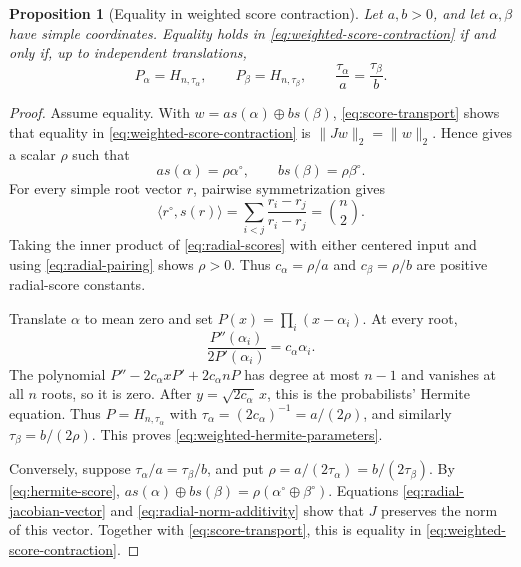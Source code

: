 \documentclass[12pt,reqno]{amsart}
\newtheorem{proposition}[proposition]{Proposition}
\theoremstyle{definition}
\theoremstyle{remark}
\begin{document}
\begin{proposition}[Equality in weighted score contraction]
\label{prop:weighted-score-equality}
Let \(a,b>0\), and let \(\alpha,\beta\) have simple coordinates.  Equality
holds in \eqref{eq:weighted-score-contraction} if and only if, up to
independent translations,
\begin{equation}\label{eq:weighted-hermite-parameters}
 P_\alpha=H_{n,\tau_\alpha},\qquad
 P_\beta=H_{n,\tau_\beta},\qquad
 \frac{\tau_\alpha}{a}=\frac{\tau_\beta}{b}.
\end{equation}
\end{proposition}

\begin{proof}
Assume equality.  With
\(w=a s(\alpha)\oplus b s(\beta)\),
\eqref{eq:score-transport} shows that equality in
\eqref{eq:weighted-score-contraction} is
\(\lVert Jw\rVert_2=\lVert w\rVert_2\).
Hence  gives a scalar \(\rho\) such that
\begin{equation}\label{eq:radial-scores}
 a s(\alpha)=\rho\alpha^\circ,
 \qquad b s(\beta)=\rho\beta^\circ.
\end{equation}
For every simple root vector \(r\), pairwise symmetrization gives
\begin{equation}\label{eq:radial-pairing}
 \langle r^\circ,s(r)\rangle
 =\sum_{i<j}\frac{r_i-r_j}{r_i-r_j}
 =\binom n2.
\end{equation}
Taking the inner product of \eqref{eq:radial-scores} with either centered
input and using \eqref{eq:radial-pairing} shows \(\rho>0\).  Thus
\(c_\alpha=\rho/a\) and \(c_\beta=\rho/b\) are positive radial-score
constants.

Translate \(\alpha\) to mean zero and set
\(P(x)=\prod_i(x-\alpha_i)\).  At every root,
\begin{equation}\label{eq:score-log-derivative}
 \frac{P''(\alpha_i)}{2P'(\alpha_i)}=c_\alpha\alpha_i.
\end{equation}
The polynomial \(P''-2c_\alpha xP'+2c_\alpha nP\) has degree at most
\(n-1\) and vanishes at all \(n\) roots, so it is zero.  After
\(y=\sqrt{2c_\alpha}\,x\), this is the probabilists' Hermite equation.
Thus \(P=H_{n,\tau_\alpha}\) with
\(\tau_\alpha=(2c_\alpha)^{-1}=a/(2\rho)\), and similarly
\(\tau_\beta=b/(2\rho)\).  This proves \eqref{eq:weighted-hermite-parameters}.

Conversely, suppose \(\tau_\alpha/a=\tau_\beta/b\), and put
\(\rho=a/(2\tau_\alpha)=b/(2\tau_\beta)\).  By
\eqref{eq:hermite-score},
\(a s(\alpha)\oplus b s(\beta)
=\rho(\alpha^\circ\oplus\beta^\circ)\).
Equations \eqref{eq:radial-jacobian-vector} and
\eqref{eq:radial-norm-additivity} show that \(J\) preserves the norm of this
vector.  Together with \eqref{eq:score-transport}, this is equality in
\eqref{eq:weighted-score-contraction}.
\end{proof}
\end{document}
